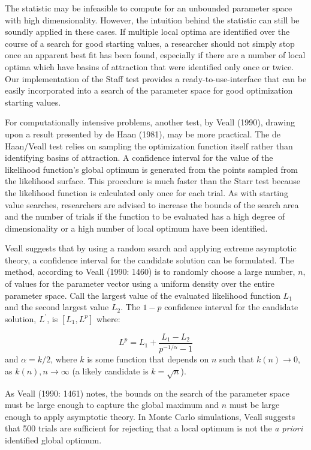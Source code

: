 \documentclass[11pt]{article}
\begin{document}
The statistic may be infeasible to compute for an unbounded parameter space with 
high dimensionality. However, the intuition behind the statistic
can still  be soundly applied in these cases. If multiple local optima are identified over the
course of a search for good starting values, a researcher should
not simply stop once an apparent best fit has been found,
especially if there are a number of local optima which have basins
of attraction that were identified only once or twice. Our implementation
of the Staff test provides a ready-to-use-interface that can be 
easily incorporated into a search of the parameter space for good  optimization 
starting values.

For computationally intensive problems, another test, by Veall (1990), drawing upon a 
result presented by de Haan (1981), may be more practical. The de Haan/Veall test relies on
 sampling the optimization function itself rather than
identifying basins of attraction. A confidence interval for 
the value of the likelihood function's global optimum is generated from
the points sampled from the likelihood surface. This procedure is much faster than the Starr
test because  the likelihood function  is calculated  only once for each 
trial. As with starting value searches, researchers are
advised to increase the bounds of the search area and the number
of trials if the function to be evaluated has a high degree of
dimensionality or a high number of local optimum have been
identified.

Veall suggests that by using a random search and applying extreme asymptotic theory, a confidence interval for the candidate
solution can be formulated. The method, according to Veall (1990:
1460) is to randomly choose a large number, $n$, of values for the
parameter vector using a uniform density over the entire parameter
space. Call the largest value of the evaluated likelihood function
$L_1$ and the second largest value $L_2$. The $1-p$ confidence
interval for the candidate solution, $L^{'}$, is $[L_1,L^p]$
where:

\begin{equation}\label{Veall.test.equation}
    L^p =L_1+\frac{ L_1-L_2 }{ p^{-1/\alpha}-1 }
\end{equation}
and $\alpha = k/2$, where $k$ is some function that depends on $n$ such that
$k(n)\rightarrow 0$, as $k(n),n \rightarrow \infty$ (a likely candidate is
$k=\sqrt{n}$).

As Veall (1990: 1461) notes, the bounds on the search of the
parameter space must be large enough to capture the global maximum
and $n$ must be large enough to apply asymptotic theory. In Monte
Carlo simulations, Veall suggests that 500 trials are sufficient
for rejecting that a local optimum is not the \emph{a priori}
identified global optimum. 
\end{document}
